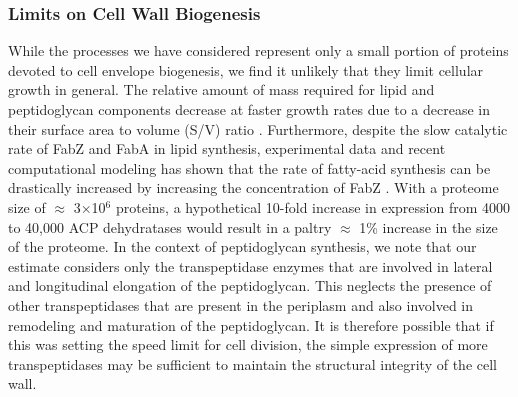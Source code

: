 \subsubsection{Limits on Cell Wall Biogenesis}
While the processes we have considered represent only a small portion of
proteins devoted to cell envelope biogenesis, we find it unlikely that they
limit cellular growth in general. The relative amount of mass required for
lipid and peptidoglycan components decrease at faster growth rates due to a
decrease in their surface area to volume (S/V) ratio \citep{ojkic2019}.
Furthermore, despite the slow catalytic rate of FabZ and FabA in lipid
synthesis, experimental data and recent computational modeling has shown that
the rate of fatty-acid synthesis can be drastically increased by increasing
the concentration of FabZ \citep{yu2011, ruppe2018}. With a proteome size of
$\approx$ 3$\times$10$^6$ proteins, a hypothetical 10-fold increase in
expression from 4000 to 40,000 ACP dehydratases would result in a paltry
$\approx$ 1\% increase in the size of the proteome. In the context of
peptidoglycan synthesis, we note that our estimate considers only the
transpeptidase enzymes that are involved in lateral and longitudinal elongation
of the peptidoglycan. This neglects the presence of other transpeptidases
that are present in the periplasm and also involved in remodeling and
maturation of the peptidoglycan. It is therefore possible that if this was
setting the speed limit for cell division, the simple expression of more
transpeptidases may be sufficient to maintain the structural integrity of the
cell wall.

